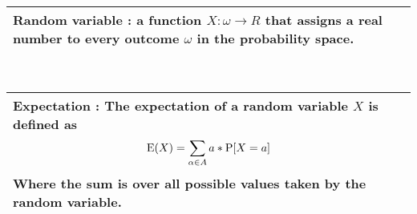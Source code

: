 {\tabulinesep=1mm
\begin{tabu}{|p{16cm} |}
\hline
\vspace{2 mm}
\textbf{Random variable} : a function $X : \omega \rightarrow R$ 
that assigns a real number to every outcome $\omega$ in the probability space.
\vspace{2 mm}
\\
\hline
\end{tabu}
} \\

{\tabulinesep=1mm
\begin{tabu}{|p{16cm} |}
\hline
\vspace{2 mm}
\textbf{Expectation} : The expectation of a random variable $X$ is defined as
\[\text{E}(X) = \sum_{\alpha \in A}a * \text{P}[X = a]\]
Where the sum is over all possible values taken by the random variable.
\vspace{2 mm}
\\
\hline
\end{tabu}
}